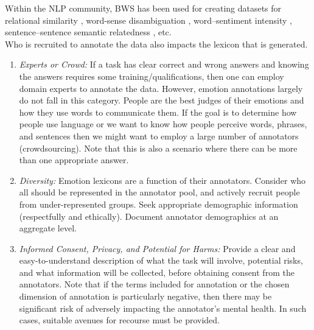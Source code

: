 \documentclass[11pt]{article}
\begin{document}
Within the NLP community, 
BWS has been used for creating datasets for relational similarity \cite{jurgens-EtAl:2012:STARSEM-SEMEVAL}, word-sense disambiguation \cite{Jurgens2013EmbracingAA}, word--sentiment intensity \cite{maxdiff-naacl2016}, sentence--sentence semantic relatedness \cite{abdalla2023makes}, 
etc.\\[-4pt]


 Who is recruited to annotate the data also impacts the lexicon that is generated. \\[-18pt]
\begin{enumerate}[label=\alph*.]
\item \textit{Experts or Crowd:} If a task has clear correct and wrong answers and knowing the answers requires some training/qualifications, then one can employ domain experts to annotate the data. However, emotion annotations largely do not fall in this category. People are the best judges of their emotions and how they use words to communicate them. If the goal is to determine how people use language  or we want to know how people perceive words, phrases, and sentences then we might want to employ a large number of annotators (crowdsourcing). 
Note that this is also a scenario where there can be more than one appropriate answer.\\[-20pt]
\item \textit{Diversity:} Emotion lexicons are a function of their annotators. Consider who all should be represented in the annotator pool, and actively recruit people from under-represented groups. Seek appropriate demographic information (respectfully and ethically).  Document annotator demographics at an aggregate level. \\[-20pt]
\item {\it Informed Consent, Privacy, and Potential for Harms:} Provide a clear and easy-to-understand description of what the task will involve, potential risks, and what information will be collected, before obtaining consent from the annotators. Note that if the terms included for annotation or the chosen dimension of annotation is particularly negative, then there may be significant risk of adversely impacting the annotator's mental health. In such cases, suitable avenues for recourse must be provided.\\[-20pt]

\end{enumerate}
\end{document}
